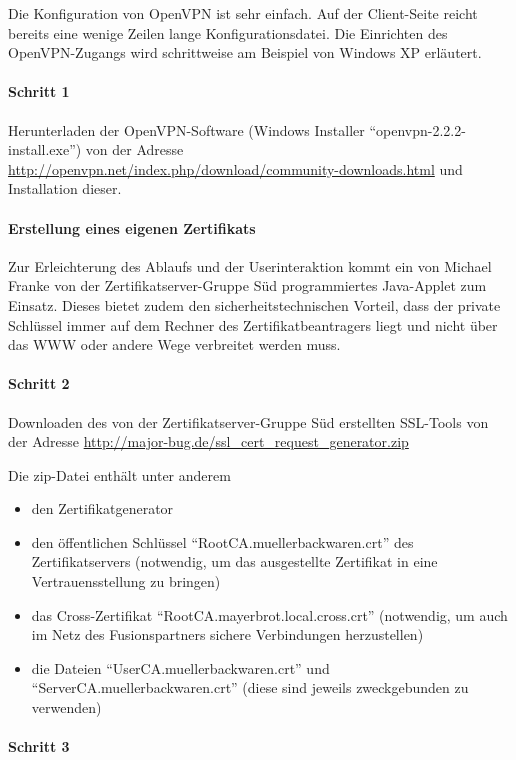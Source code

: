 Die Konfiguration von OpenVPN ist sehr einfach. Auf der Client-Seite reicht
bereits eine wenige Zeilen lange Konfigurationsdatei. Die Einrichten des
OpenVPN-Zugangs wird schrittweise am Beispiel von Windows XP erläutert.

\paragraph{Schritt 1}
Herunterladen der OpenVPN-Software (Windows Installer
``openvpn-2.2.2-install.exe'') von der Adresse
\url{http://openvpn.net/index.php/download/community-downloads.html} und
Installation dieser.

\paragraph{Erstellung eines eigenen Zertifikats}
Zur Erleichterung des Ablaufs und der Userinteraktion kommt ein von Michael
Franke von der Zertifikatserver-Gruppe Süd programmiertes Java-Applet zum
Einsatz. Dieses bietet zudem den sicherheitstechnischen Vorteil, dass der
private Schlüssel immer auf dem Rechner des Zertifikatbeantragers liegt und
nicht über das WWW oder andere Wege verbreitet werden muss.


\paragraph{Schritt 2}

Downloaden des von der Zertifikatserver-Gruppe Süd erstellten SSL-Tools von der
Adresse \url{http://major-bug.de/ssl_cert_request_generator.zip}

Die zip-Datei enthält unter anderem

\begin{itemize}
  \item den Zertifikatgenerator
  \item den öffentlichen Schlüssel ``RootCA.muellerbackwaren.crt'' des
    Zertifikatservers (notwendig, um das ausgestellte Zertifikat in eine
    Vertrauensstellung zu bringen)
  \item das Cross-Zertifikat ``RootCA.mayerbrot.local.cross.crt'' (notwendig, um
    auch im Netz des Fusionspartners sichere Verbindungen herzustellen)
  \item die Dateien ``UserCA.muellerbackwaren.crt'' und
    ``ServerCA.muellerbackwaren.crt'' (diese sind jeweils zweckgebunden zu
    verwenden)
\end{itemize}

\paragraph{Schritt 3}

